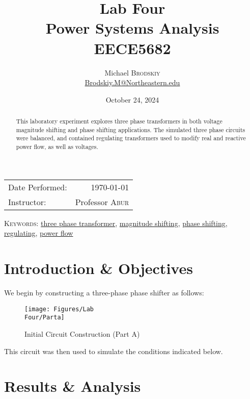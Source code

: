 \documentclass[
	letterpaper, %
	10pt, %
]{CSUniSchoolLabReport}
\title{Lab Four\\ Power Systems Analysis \\ EECE5682} %
\author{Michael \textsc{Brodskiy}\\ \small \href{mailto:Brodskiy.M@Northeastern.edu}{Brodskiy.M@Northeastern.edu}}
\date{October 24, 2024} %
\begin{document}
\maketitle %

\begin{center}
	\begin{tabular}{l r}
		Date Performed: & \today \\ %
		Instructor: & Professor \textsc{Abur} \\ %
	\end{tabular}
\end{center}

\newpage

\begin{abstract}

  This laboratory experiment explores three phase transformers in both voltage magnitude shifting and phase shifting applications. The simulated three phase circuits were balanced, and contained regulating transformers used to modify real and reactive power flow, as well as voltages.

\end{abstract}

\begin{flushleft}

  \textsc{Keywords:} \underline{three phase transformer}, \underline{magnitude shifting}, \underline{phase shifting}, \underline{regulating}, \underline{power flow}

\end{flushleft}

\newpage

\section{Introduction \& Objectives}

We begin by constructing a three-phase phase shifter as follows:

\begin{figure}[H]
  \centering
  \texttt{[image: Figures/Lab\\ Four/Parta]}
  \caption{Initial Circuit Construction (Part A)}
  \label{fig:1}
\end{figure}

This circuit was then used to simulate the conditions indicated below.

\section{Results \& Analysis} 
\end{document}
